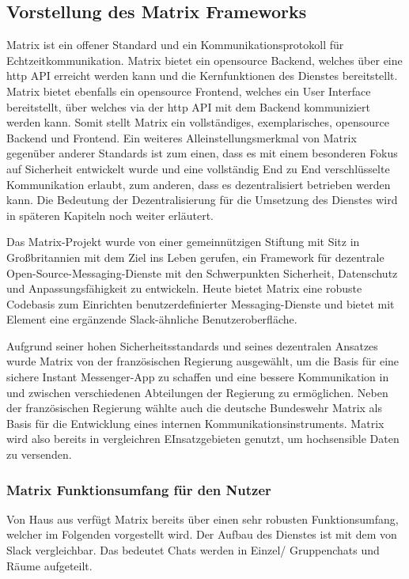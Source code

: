 \subsection{Vorstellung des Matrix Frameworks}\label{chapter:vdmf}
Matrix ist ein offener Standard und ein Kommunikationsprotokoll für  Echtzeitkommunikation. Matrix bietet ein opensource Backend, welches über eine http API erreicht werden kann und die Kernfunktionen des Dienstes bereitstellt. Matrix bietet ebenfalls ein opensource Frontend, welches ein User Interface bereitstellt, über welches via der http API mit dem Backend kommuniziert werden kann. Somit stellt Matrix ein vollständiges, exemplarisches, opensource Backend und Frontend. Ein weiteres Alleinstellungsmerkmal von Matrix gegenüber anderer Standards ist zum einen, dass es mit einem besonderen Fokus auf Sicherheit entwickelt wurde und eine vollständig End zu End verschlüsselte Kommunikation  erlaubt, zum anderen, dass es dezentralisiert betrieben werden kann. Die Bedeutung der Dezentralisierung für die Umsetzung des Dienstes wird in späteren Kapiteln noch weiter erläutert.

Das Matrix-Projekt wurde von einer gemeinnützigen Stiftung mit Sitz in Großbritannien mit dem Ziel ins Leben gerufen, ein Framework für dezentrale Open-Source-Messaging-Dienste mit den Schwerpunkten Sicherheit, Datenschutz und Anpassungsfähigkeit zu entwickeln. Heute bietet Matrix eine robuste Codebasis zum Einrichten benutzerdefinierter Messaging-Dienste und bietet mit Element eine ergänzende Slack-ähnliche Benutzeroberfläche.

Aufgrund seiner hohen Sicherheitsstandards und seines dezentralen Ansatzes wurde Matrix  von der französischen Regierung ausgewählt, um die Basis für eine sichere Instant Messenger-App zu schaffen und eine bessere Kommunikation in und zwischen verschiedenen Abteilungen der Regierung zu ermöglichen. Neben der französischen Regierung wählte auch die deutsche Bundeswehr Matrix als Basis für die Entwicklung eines internen Kommunikationsinstruments. Matrix wird also bereits in vergleichren EInsatzgebieten genutzt, um hochsensible Daten zu versenden.

\subsubsection{Matrix Funktionsumfang für den Nutzer}\label{chapter:aemn}
Von Haus aus verfügt Matrix bereits über einen sehr robusten Funktionsumfang, welcher im Folgenden vorgestellt wird.
Der Aufbau des Dienstes ist mit dem von Slack vergleichbar. Das bedeutet Chats werden in Einzel/ Gruppenchats und Räume aufgeteilt. 

